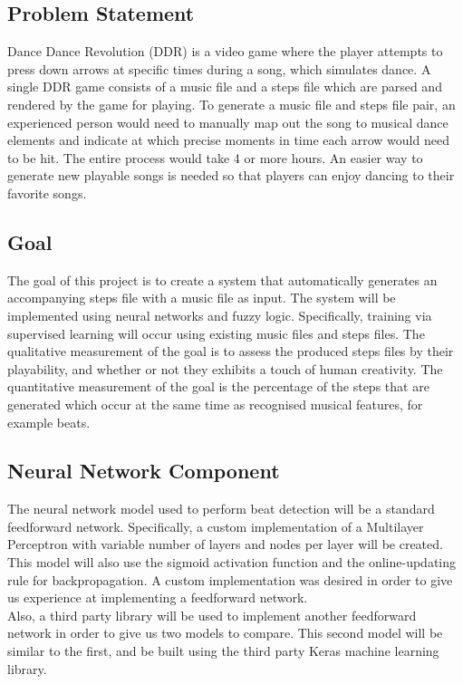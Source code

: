 \subsection{Problem Statement}
Dance Dance Revolution (DDR) is a video game where the player attempts to press down arrows at specific times during a song, which simulates dance. A single DDR game consists of a music file and a steps file which are parsed and rendered by the game for playing. To generate a music file and steps file pair, an experienced person would need to manually map out the song to musical dance elements and indicate at which precise moments in time each arrow would need to be hit. The entire process would take 4 or more hours. An easier way to generate new playable songs is needed so that players can enjoy dancing to their favorite songs.\\

\subsection{Goal}
The goal of this project is to create a system that automatically generates an accompanying steps file with a music file as input. The system will be implemented using neural networks and fuzzy logic. Specifically, training via supervised learning will occur using existing music files and steps files. The qualitative measurement of the goal is to assess the produced steps files by their playability, and whether or not they exhibits a touch of human creativity. The quantitative measurement of the goal is the percentage of the steps that are generated which occur at the same time as recognised musical features, for example beats.\\

\subsection{Neural Network Component}

The neural network model used to perform beat detection will be a standard feedforward network. Specifically, a custom implementation of a Multilayer Perceptron with variable number of layers and nodes per layer will be created. This model will also use the sigmoid activation function and the online-updating rule for backpropagation. A custom implementation was desired in order to give us experience at implementing a feedforward network.\\

Also, a third party library will be used to implement another feedforward network in order to give us two models to compare. This second model will be similar to the first, and be built using the third party Keras machine learning library.